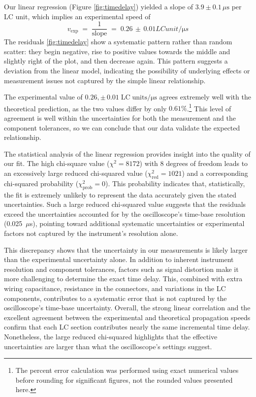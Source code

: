 \documentclass[
	a4paper, %
	10pt, %
	twoside, %
]{journal}
\begin{document}
Our linear regression (Figure \ref{fig:timedelay}) yielded a slope of  $3.9 \pm 0.1\,\mu\mathrm{s}$ per LC unit, which implies an experimental speed of 
\[
v_{\mathrm{exp}} \;=\; \frac{1}{\text{slope}} \;=\; 0.26\,\pm\,0.01 \unit{LCunit/\micro s}
\]
The residuals \ref{fig:timedelay} show a systematic pattern rather than random scatter: they begin negative, rise to positive values towards the middle and slightly right of the plot, and then decrease again. This pattern suggests a deviation from the linear model, indicating the possibility of underlying effects or measurement issues not captured by the simple linear relationship.

The experimental value of $0.26,\pm\,0.01\;\mathrm{LC\;units/\mu s}$ agrees extremely well with the theoretical prediction, as the two values differ by only $0.61\%$.\footnote{The percent error calculation was performed using exact numerical values before rounding for significant figures, not the rounded values presented here.} This level of agreement is well within the uncertainties for both the measurement and the component tolerances, so we can conclude that our data validate the expected relationship.

The statistical analysis of the linear regression provides insight into the quality of our fit. The high chi-square value ($\chi^2 = 8172$) with 8 degrees of freedom leads to an excessively large reduced chi-squared value ($\chi^2_{\mathrm{red}} = 1021$) and a corresponding chi-squared probability ($\chi^2_{\mathrm{prob}} = 0$). This probability indicates that, statistically, the fit is extremely unlikely to represent the data accurately given the stated uncertainties. Such a large reduced chi-squared value suggests that the residuals exceed the uncertainties accounted for by the oscilloscope’s time-base resolution (0.025~$\mu$s), pointing toward additional systematic uncertainties or experimental factors not captured by the instrument's resolution alone.

This discrepancy shows that the uncertainty in our measurements is likely larger than the experimental uncertainty alone. In addition to inherent instrument resolution and component tolerances, factors such as signal distortion make it more challenging to determine the exact time delay. This, combined with extra wiring capacitance, resistance in the connectors, and  variations in the LC components, contributes to a systematic error that is not captured by the oscilloscope's time-base uncertainty. Overall, the strong linear correlation and the excellent agreement between the experimental and theoretical propagation speeds confirm that each LC section contributes nearly the same incremental time delay. Nonetheless, the large reduced chi-squared highlights that the effective uncertainties are larger than what the oscilloscope’s settings suggest.
 
\end{document}
